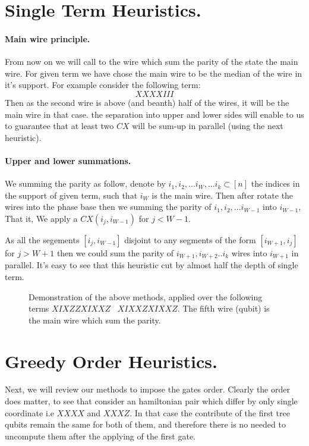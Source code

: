 \documentclass{article}
\begin{document}
\begin{multicols*}{2}
\section{Single Term Heuristics.}

\paragraph{Main wire principle.} From now on we will call to the wire which sum the parity of the state the main wire. For given term we have chose the main wire to be the median of the wire in it's support. For example consider the following term:
\begin{equation*}
    XXXXIII
\end{equation*} 
Then as the second wire is above (and beanth) half of the wires, it will be the main wire in that case. the separation into upper and lower sides will enable to us to guarantee that at least two \(CX\) will be sum-up in parallel (using the next heuristic).
\paragraph{Upper and lower summations.}  We summing the parity as follow, denote by \( i_{1}, i_{2}, ... i_{W} , ... i_{k} \subset [n] \) the indices in the support of given term, such that \(i_{W}\) is the main wire. Then after rotate the wires into the phase base then we summing the parity of \(i_{1}, i_{2}, ... i_{W-1}\) into \(i_{W-1}\), That it, We apply a \(CX\left(i_{j}, i_{W-1}\right)\) for \(j < W-1\). 

As all the segements \([i_{j}, i_{W-1}]\) disjoint to any segments of the form  \([i_{W+1}, i_{j}]\) for \(j > W+1\) then we could sum the parity of \(i_{W+1},   i_{W+2} .. i_{k}\) wires into \(i_{W+1}\) in parallel. It's easy to see that this heuristic cut by almost half the depth of single term. 

\begin{figure}[H]
  \centering
    
    \caption{ Demonstration of the above methods, applied over the following terms    \( XIXZZXIXXZ \) \ \( XIXXZXIXXZ \). The fifth wire (qubit) is the main wire which sum the parity. }
    \label{fig:average-data-vs-model}
\end{figure}


\section{Greedy Order Heuristics.}
Next, we will review our methods to impose the gates order. Clearly the order does matter, to see that consider an hamiltonian pair which differ by only single coordinate i.e \(XXXX\) and \(XXXZ\). In that case the contribute of the first tree qubits remain the same for both of them, and therefore there is no needed to uncompute them after the applying of the first gate.      

\end{multicols*}
\end{document}
